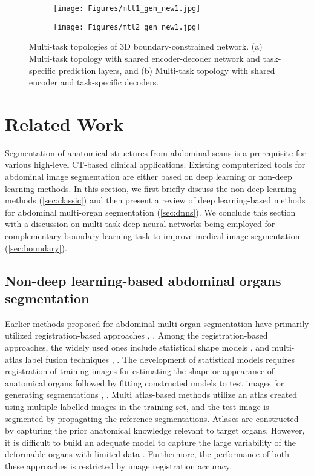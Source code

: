 \documentclass[final,5p,times,twocolumn]{elsarticle}
\begin{document}
\begin{figure*}[!h]
\begin{subfigure}[b]{.45\textwidth}
\hspace{3mm}
\texttt{[image: Figures/mtl1\_gen\_new1.jpg]} 
\caption{}
\label{fig:unet_mtl_gen1}
\end{subfigure}\hfill
\begin{subfigure}[b]{.42\textwidth}
\hspace{-5mm}
\texttt{[image: Figures/mtl2\_gen\_new1.jpg]}
\caption{}
\label{fig:unet_mtl_gen1k}
\end{subfigure}
\caption{Multi-task topologies of 3D boundary-constrained network. (a) Multi-task topology with shared encoder-decoder network and task-specific prediction layers, and (b) Multi-task topology with shared encoder and task-specific decoders.}
\label{fig:unet_mtl_gen2}
\end{figure*}
\section{Related Work}\label{sec:related}
Segmentation of anatomical structures from abdominal scans is a prerequisite for various high-level CT-based clinical applications. Existing computerized tools for abdominal image segmentation are either based on deep learning or non-deep learning methods. In this section, we first briefly discuss the non-deep learning methods (\autoref{sec:classic}) and then present a review of deep learning-based methods for abdominal multi-organ segmentation (\autoref{sec:dnns}). We conclude this section with a discussion on multi-task deep neural networks being employed for complementary boundary learning task to improve medical image segmentation (\autoref{sec:boundary}).
\subsection{Non-deep learning-based abdominal organs segmentation}\label{sec:classic}
Earlier methods proposed for abdominal multi-organ segmentation have primarily utilized registration-based approaches \cite{cerrolaza2015automatic},  \cite{okada2015abdominal}. Among the registration-based approaches, the widely used ones include statistical shape models \cite{cerrolaza2015automatic}, \cite{okada2015abdominal} and multi-atlas label fusion techniques \cite{xu2015efficient}, \cite{suzuki2012multi}. The development of statistical models requires registration of training images for estimating the shape or appearance of anatomical organs followed by fitting constructed models to test images for generating segmentations \cite{heimann2009statistical}, \cite{cootes2001active}. Multi atlas-based methods utilize an atlas created using multiple labelled images in the training set, and the test image is segmented by propagating the reference segmentations. Atlases are constructed by capturing the prior anatomical knowledge relevant to target organs. However, it is difficult to build an adequate model to capture the large variability of the deformable organs with limited data \cite{xu2016evaluation}. Furthermore, the performance of both these approaches is restricted by image registration accuracy. 
\end{document}
